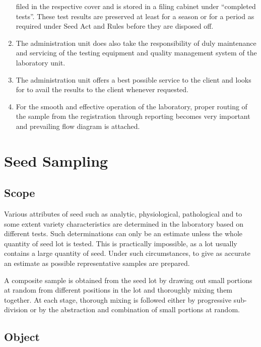 \documentclass[]{book}
\begin{document}
\begin{enumerate}
  filed in the respective cover and is stored in a filing cabinet under
  ``completed tests''. These test results are preserved at least for a
  season or for a period as required under Seed Act and Rules before
  they are disposed off.
\item
  The administration unit does also take the responsibility of duly
  maintenance and servicing of the testing equipment and quality
  management system of the laboratory unit.
\item
  The administration unit offers a best possible service to the client
  and looks for to avail the results to the client whenever requested.
\item
  For the smooth and effective operation of the laboratory, proper
  routing of the sample from the registration through reporting becomes
  very important and prevailing flow diagram is attached.
\end{enumerate}

\hypertarget{htmlwidget-2596c05ed408b554c595}{}

\chapter{Seed Sampling}\label{seed-sampling}

\section{Scope}\label{scope}

Various attributes of seed such as analytic, physiological, pathological
and to some extent variety characteristics are determined in the
laboratory based on different tests. Such determinations can only be an
estimate unless the whole quantity of seed lot is tested. This is
practically impossible, as a lot usually contains a large quantity of
seed. Under such circumstances, to give as accurate an estimate as
possible representative samples are prepared.

A composite sample is obtained from the seed lot by drawing out small
portions at random from different positions in the lot and thoroughly
mixing them together. At each stage, thorough mixing is followed either
by progressive sub-division or by the abstraction and combination of
small portions at random.

\section{Object}\label{object}
\end{document}
